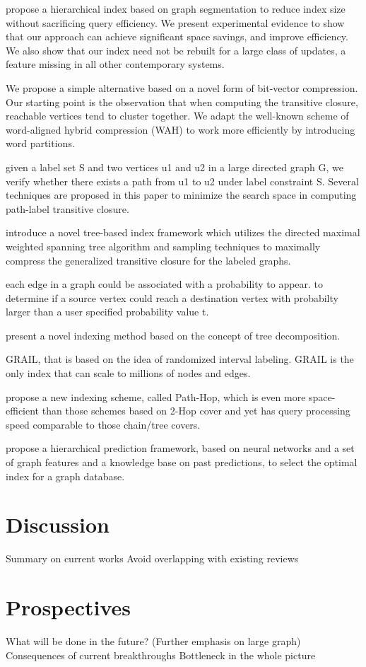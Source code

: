 \documentclass[12pt, conference, compsocconf]{../IEEEtran}
\begin{document}
\citep{1053} propose a hierarchical index based on graph segmentation to reduce index size without sacrificing query efficiency. We present experimental evidence to show that our approach can achieve significant space savings, and improve efficiency. We also show that our index need not be rebuilt for a large class of updates, a feature missing in all other contemporary systems.

\citep{1054} We propose a simple alternative based on a novel form of bit-vector compression. Our starting point is the observation that when computing the transitive closure, reachable vertices tend to cluster together. We adapt the well-known scheme of word-aligned hybrid compression (WAH) to work more efficiently by introducing word partitions. 

\citep{1055} given a label set S and two vertices u1 and u2 in a large directed graph G, we verify whether there exists a path from u1 to u2 under label constraint S. Several techniques are proposed in this paper to minimize the search space in computing path-label transitive closure.

\citep{1057} introduce a novel tree-based index framework which utilizes the directed maximal weighted spanning tree algorithm and sampling techniques to maximally compress the generalized transitive closure for the labeled graphs.

\citep{1056} each edge in a graph could be associated with a probability to appear. to determine if a source vertex could reach a destination vertex with probabilty larger than a user specified probability value t.

\citep{1058} present a novel indexing method based on the concept of tree decomposition. 

\citep{1059} GRAIL, that is based on the idea of randomized interval labeling. GRAIL is the only index that can scale to millions of nodes and edges.

\citep{1060} propose a new indexing scheme, called Path-Hop, which is even more space-efficient than those schemes based on 2-Hop cover and yet has query processing speed comparable to those chain/tree covers. 

\citep{1061} propose a hierarchical prediction framework, based on neural networks and a set of graph features and a knowledge base on past predictions, to select the optimal index for a graph database.

\section{Discussion}

Summary on current works
  Avoid overlapping with existing reviews

\section{Prospectives}

What will be done in the future? (Further emphasis on large graph)
  Consequences of current breakthroughs
  Bottleneck in the whole picture



\end{document}
